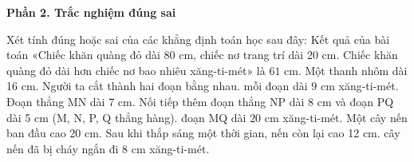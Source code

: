 \textbf{Phần 2. Trắc nghiệm đúng sai}

\begin{ex} %
Xét tính đúng hoặc sai của các khẳng định toán học sau đây:
\choiceTF
{Kết quả của bài toán «Chiếc khăn quàng đỏ dài 80 cm, chiếc nơ trang trí dài 20 cm. Chiếc khăn quàng đỏ dài hơn chiếc nơ bao nhiêu xăng-ti-mét» là $61\text{ cm}$.}
{Một thanh nhôm dài 16 cm. Người ta cắt thành hai đoạn bằng nhau. mỗi đoạn dài $9\text{ cm}$ xăng-ti-mét.}
{\True Đoạn thẳng MN dài 7 cm. Nối tiếp thêm đoạn thẳng NP dài 8 cm và đoạn PQ dài 5 cm (M, N, P, Q thẳng hàng). đoạn MQ dài $20\text{ cm}$ xăng-ti-mét.}
{\True Một cây nến ban đầu cao 20 cm. Sau khi thắp sáng một thời gian, nến còn lại cao 12 cm. cây nến đã bị cháy ngắn đi $8\text{ cm}$ xăng-ti-mét.}
\end{ex}

